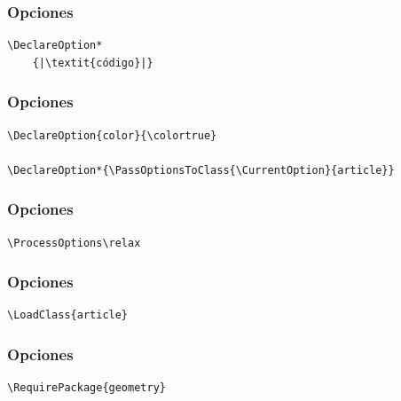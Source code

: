 \documentclass[12pt,aspectratio=169,ignorenonframetext]{ltxbeamer}
\begin{document}
\begin{frame}[fragile]
\frametitle{Opciones}

\begin{verbatim}
\DeclareOption*
    {|\textit{código}|}
\end{verbatim}
\end{frame}





\begin{frame}[fragile]
\frametitle{Opciones}

\begin{verbatim}
\DeclareOption{color}{\colortrue}

\DeclareOption*{\PassOptionsToClass{\CurrentOption}{article}}
\end{verbatim}
\end{frame}





\begin{frame}[fragile]
\frametitle{Opciones}

\begin{verbatim}
\ProcessOptions\relax
\end{verbatim}
\end{frame}





\begin{frame}[fragile]
\frametitle{Opciones}

\begin{verbatim}
\LoadClass{article}
\end{verbatim}
\end{frame}





\begin{frame}[fragile]
\frametitle{Opciones}

\begin{verbatim}
\RequirePackage{geometry}
\end{verbatim}
\end{frame}
\end{document}
